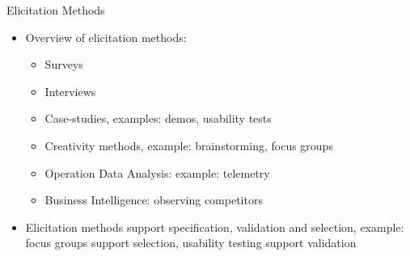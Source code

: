 \begin{Slide}{Elicitation Methods}
\begin{itemize}
\item Overview of elicitation methods: 
\begin{itemize}
\item Surveys
\item Interviews
\item Case-studies, examples:  demos, usability tests
\item Creativity methods, example: brainstorming, focus groups
\item Operation Data Analysis: example: telemetry
\item Business Intelligence: observing competitors 

\end{itemize}
\item Elicitation methods support specification, validation and selection, example: focus groups support selection, usability testing support validation

\end{itemize}
\end{Slide}